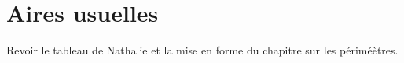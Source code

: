 \section{Aires usuelles}
Revoir le tableau de Nathalie et la mise en forme du chapitre sur les périméètres.


